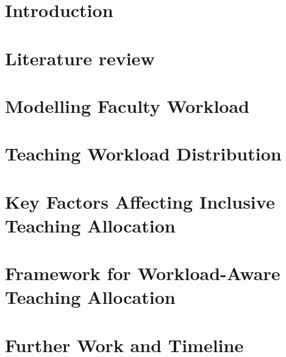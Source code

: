 \documentclass[12pt,a4paper]{report}
\begin{document}


\doublespacing

\listoffigures          %
\singlespacing          %
\listoftables           %


\tableofcontents


\doublespacing

\chapter{Introduction}

\chapter{Literature review}


\chapter{Modelling Faculty Workload}


\chapter{Teaching Workload Distribution}


\chapter{Key Factors Affecting Inclusive Teaching Allocation}


\chapter{Framework for Workload-Aware Teaching Allocation}


\chapter{Further Work and Timeline}



\singlespacing
\printbibliography
\end{document}
